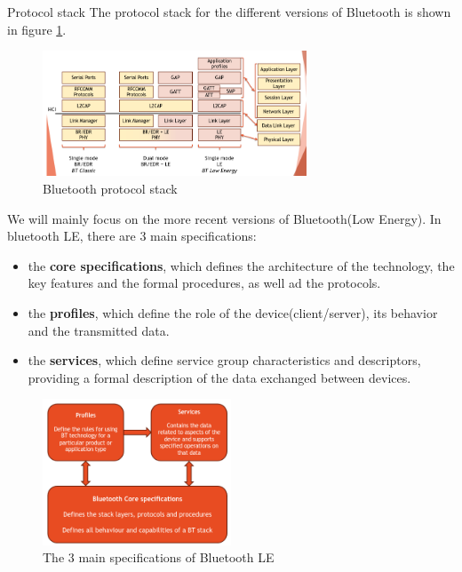 \begin{section}{Protocol stack}
  The protocol stack for the different versions of Bluetooth is shown in figure \ref{fig:bluetooth stack}.
  \begin{figure}[H]
    \centering
    \includegraphics[width=0.7\textwidth]{img/wireless/bluetooth protocol tack.png}
    \caption{Bluetooth protocol stack}
    \label{fig:bluetooth stack}
  \end{figure}
  We will mainly focus on the more recent versions of Bluetooth(Low Energy).
  In bluetooth LE, there are 3 main specifications:
  \begin{itemize}
    \item the \textbf{core specifications}, which defines the architecture of the technology, the
      key features and the formal procedures, as well ad the protocols. 
    \item the \textbf{profiles}, which define the role of the device(client/server), its behavior and the
      transmitted data.
    \item the \textbf{services}, which define service group characteristics and descriptors,
      providing a formal description of the data exchanged between devices.
  \end{itemize}
  \begin{figure}[H]
    \centering
    \includegraphics[width=0.5\textwidth]{img/wireless/bt specifivations.png}
    \caption{The 3 main specifications of Bluetooth LE}
  \end{figure}
  \begin{figure}[H]

\end{figure}
\end{section}
